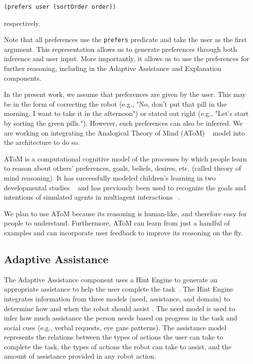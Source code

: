 \documentclass[letterpaper]{article} %
\begin{document}
 \small{
 \begin{verbatim}(prefers user (sortOrder order))
  \end{verbatim}}
 \vspace{-4mm}
 \noindent 
 respectively. 
 
 Note that all preferences use the \texttt{prefers} predicate and take the user as the first argument. This representation allows us to generate preferences through both inference and user input. More importantly, it allows us to use the preferences for further reasoning, including in the Adaptive Assistance and Explanation components.
 
 In the present work, we assume that preferences are given by the user. This may be in the form of correcting the robot (e.g., "No, don't put that pill in the morning. I want to take it in the afternoon") or stated out right (e.g., "Let's start by sorting the green pills."). However, such preferences can also be inferred. We are working on integrating the Analogical Theory of Mind (AToM) ~\cite{rabkina2017towards} model into the architecture to do so.
 
 AToM is a computational cognitive model of the processes by which people learn to reason about others' preferences, goals, beliefs, desires, etc. (called theory of mind reasoning). It has successfully modeled children's learning in two developmental studies ~\cite{rabkina2017towards,rabkina2018bootstrapping} and has previously been used to recognize the goals and intentions of simulated agents in multiagent interactions ~\cite{rabkina2019analogical,rabkina2020acs}. 
 
 We plan to use AToM because its reasoning is human-like, and therefore easy for people to understand. Furthermore, AToM can learn from just a handful of examples and can incorporate user feedback to improve its reasoning on the fly.

\subsection{Adaptive Assistance}

The Adaptive Assistance component uses a Hint Engine to generate an appropriate assistance to help the user complete the task~\cite{wilson2018general}.  The Hint Engine integrates information from three models (need, assistance, and domain) to determine how and when the robot should assist \cite{wilson2019developing}.  The need model is used to infer how much assistance the person needs based on progress in the task and social cues (e.g., verbal requests, eye gaze patterns).  The assistance model represents the relations between the types of actions the user can take to complete the task, the types of actions the robot can take to assist, and the amount of assistance provided in any robot action.
\end{document}
